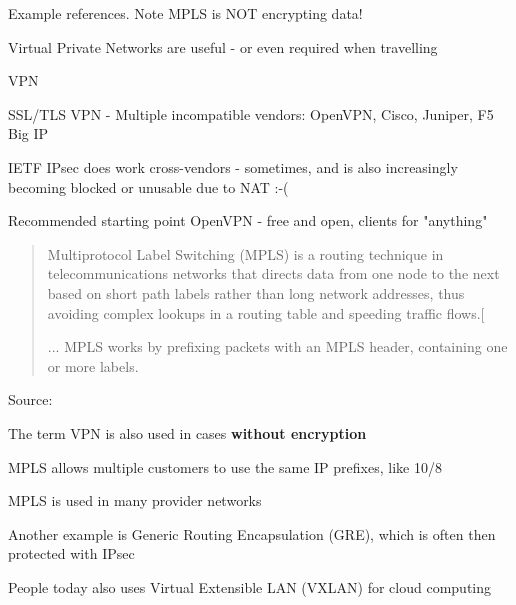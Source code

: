\documentclass[Screen16to9,17pt]{foils}
\begin{document}
Example references. Note MPLS is NOT encrypting data!




\begin{list1}
\item Virtual Private Networks are useful - or even required when travelling
\item VPN 
\item SSL/TLS VPN - Multiple incompatible vendors: OpenVPN, Cisco, Juniper, F5 Big IP
\item IETF IPsec does work cross-vendors - sometimes, and is also increasingly becoming blocked or unusable due to NAT :-(
\item Recommended starting point OpenVPN - free and open, clients for "anything"
\end{list1}


\begin{quote}
Multiprotocol Label Switching (MPLS) is a routing technique in telecommunications networks that directs data from one node to the next based on short path labels rather than long network addresses, thus avoiding complex lookups in a routing table and speeding traffic flows.[

...
MPLS works by prefixing packets with an MPLS header, containing one or more labels.
\end{quote}

Source:\\
{\footnotesize{}}

\begin{list2}
\item The term VPN is also used in cases {\bf without encryption}
\item MPLS allows multiple customers to use the same IP prefixes, like 10/8
\item MPLS is used in many provider networks
\item Another example is Generic Routing Encapsulation (GRE), which is often then protected with IPsec
\item People today also uses Virtual Extensible LAN (VXLAN) for cloud computing
\end{list2}



\end{document}
